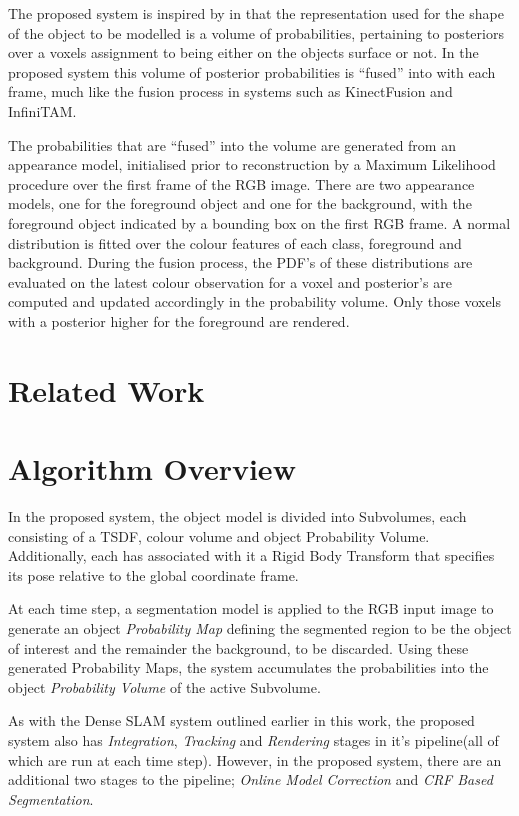 The proposed system is inspired by\cite{Kolev2006} in that the representation
used for the shape of the object to be modelled is a volume of probabilities,
pertaining to posteriors over a voxels assignment to being either on the objects
surface or not. In the proposed system this volume of posterior probabilities is
``fused'' into with each frame, much like the fusion process in systems such as
KinectFusion\cite{Newcombe2011} and InfiniTAM\cite{Prisacariu2014}.

The probabilities that are ``fused'' into the volume are generated from an
appearance model, initialised prior to reconstruction by a Maximum Likelihood
procedure over the first frame of the RGB image. There are two appearance
models, one for the foreground object and one for the background, with the
foreground object indicated by a bounding box on the first RGB frame. A normal
distribution is fitted over the colour features of each class, foreground and
background. During the fusion process, the PDF's of these distributions are
evaluated on the latest colour observation for a voxel and posterior's are
computed and updated accordingly in the probability volume. Only those voxels
with a posterior higher for the foreground are rendered.

\section{Related Work}
\label{sec:probobj_related_work}

\section{Algorithm Overview}
In the proposed system, the object model is divided into Subvolumes, each
consisting of a TSDF, colour volume and object Probability Volume. Additionally,
each has associated with it a Rigid Body Transform that specifies its pose
relative to the global coordinate frame.

At each time step, a segmentation model is applied to the RGB input image to
generate an object \textit{Probability Map} defining the segmented region to be
the object of interest and the remainder the background, to be discarded. Using
these generated Probability Maps, the system accumulates the probabilities into
the object \textit{Probability Volume} of the active Subvolume.

As with the Dense SLAM system outlined earlier in this work, the proposed system
also has \textit{Integration}, \textit{Tracking} and \textit{Rendering}
stages in it's pipeline(all of which are run at each time step). However, in
the proposed system, there are an additional two stages to the pipeline;
\textit{Online Model Correction} and \textit{CRF Based Segmentation}.

